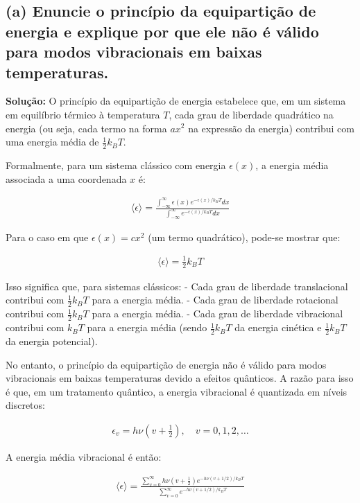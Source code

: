 \documentclass[fleqn,a4paper]{article}
\begin{document}
\subsection*{(a) Enuncie o princípio da equipartição de energia e explique por que ele não é válido para modos vibracionais em baixas temperaturas.}

\textbf{Solução:}
O princípio da equipartição de energia estabelece que, em um sistema em equilíbrio térmico à temperatura $T$, cada grau de liberdade quadrático na energia (ou seja, cada termo na forma $ax^2$ na expressão da energia) contribui com uma energia média de $\frac{1}{2}k_B T$.

Formalmente, para um sistema clássico com energia $\epsilon(x)$, a energia média associada a uma coordenada $x$ é:

\begin{align}
\langle \epsilon \rangle = \frac{\int_{-\infty}^{\infty} \epsilon(x) e^{-\epsilon(x)/k_B T} dx}{\int_{-\infty}^{\infty} e^{-\epsilon(x)/k_B T} dx}
\end{align}

Para o caso em que $\epsilon(x) = cx^2$ (um termo quadrático), pode-se mostrar que:

\begin{align}
\langle \epsilon \rangle = \frac{1}{2}k_B T
\end{align}

Isso significa que, para sistemas clássicos:
- Cada grau de liberdade translacional contribui com $\frac{1}{2}k_B T$ para a energia média.
- Cada grau de liberdade rotacional contribui com $\frac{1}{2}k_B T$ para a energia média.
- Cada grau de liberdade vibracional contribui com $k_B T$ para a energia média (sendo $\frac{1}{2}k_B T$ da energia cinética e $\frac{1}{2}k_B T$ da energia potencial).

No entanto, o princípio da equipartição de energia não é válido para modos vibracionais em baixas temperaturas devido a efeitos quânticos. A razão para isso é que, em um tratamento quântico, a energia vibracional é quantizada em níveis discretos:

\begin{align}
\epsilon_v = h\nu(v+\frac{1}{2}), \quad v = 0, 1, 2, \ldots
\end{align}

A energia média vibracional é então:

\begin{align}
\langle \epsilon \rangle = \frac{\sum_{v=0}^{\infty} h\nu(v+\frac{1}{2}) e^{-h\nu(v+1/2)/k_B T}}{\sum_{v=0}^{\infty} e^{-h\nu(v+1/2)/k_B T}}
\end{align}
\end{document}
